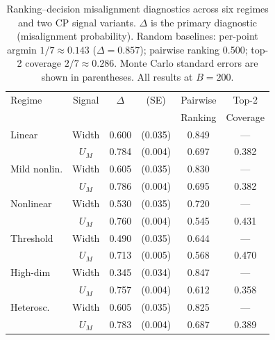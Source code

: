 \documentclass[a4paper,11pt]{article}
\begin{document}
\begin{table}[t]
    \centering
    \caption{Ranking--decision misalignment diagnostics across six regimes and two CP signal variants. $\Delta$ is the primary diagnostic (misalignment probability). Random baselines: per-point argmin $1/7 \approx 0.143$ ($\Delta = 0.857$); pairwise ranking 0.500; top-2 coverage $2/7 \approx 0.286$. Monte Carlo standard errors are shown in parentheses. All results at $B=200$.}
    \label{tab:misalignment}
    \begin{tabular}{lccccc}
        \toprule
        Regime & Signal & $\Delta$ & (SE) & Pairwise & Top-2 \\
               &        &          &      & Ranking & Coverage \\
        \midrule
        Linear & Width  & 0.600 & (0.035) & 0.849 & --- \\
               & $U_M$  & 0.784 & (0.004) & 0.697 & 0.382 \\
        \addlinespace
        Mild nonlin. & Width  & 0.605 & (0.035) & 0.830 & --- \\
               & $U_M$  & 0.786 & (0.004) & 0.695 & 0.382 \\
        \addlinespace
        Nonlinear & Width  & 0.530 & (0.035) & 0.720 & --- \\
               & $U_M$  & 0.760 & (0.004) & 0.545 & 0.431 \\
        \addlinespace
        Threshold & Width  & 0.490 & (0.035) & 0.644 & --- \\
               & $U_M$  & 0.713 & (0.005) & 0.568 & 0.470 \\
        \addlinespace
        High-dim & Width  & 0.345 & (0.034) & 0.847 & --- \\
               & $U_M$  & 0.757 & (0.004) & 0.612 & 0.358 \\
        \addlinespace
        Heterosc. & Width  & 0.605 & (0.035) & 0.825 & --- \\
               & $U_M$  & 0.783 & (0.004) & 0.687 & 0.389 \\
        \bottomrule
    \end{tabular}
\end{table}
\end{document}
